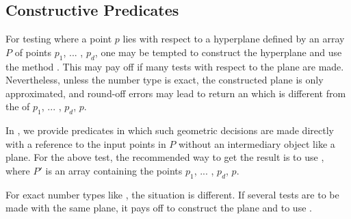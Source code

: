 \subsection{Constructive Predicates}
For testing where a point $p$ lies with respect to a hyperplane
defined by an array $P$ of points $p_1$, ... , $p_d$, one may be
tempted to construct the hyperplane  and
use the method .  This may pay off if many tests
with respect to the plane are made.  Nevertheless, unless the number
type is exact, the constructed plane is only approximated, and
round-off errors may lead  to return an
 which is different from the
 of $p_1$, ... , $p_d$, $p$.

In {\cgal}, we provide predicates in which such geometric decisions
are made directly with a reference to the input points in $P$ without
an intermediary object like a plane.  For the above test, the
recommended way to get the result is to use
, where $P'$ is an array containing the
points $p_1$, ... , $p_d$, $p$.

For exact number types like , the situation is
different. If several tests are to be made with the same plane, it
pays off to construct the plane and to use .


